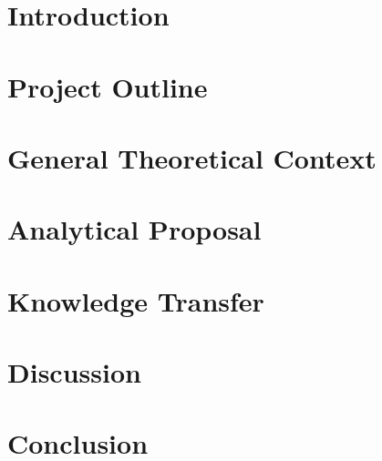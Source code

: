 \documentclass[12pt]{article}
\begin{document}

    
\section{Introduction}
\label{intro}


\section{Project Outline}
\label{project}


\section{General Theoretical Context}
\label{theory}


\section{Analytical Proposal}
\label{analysis}


\section{Knowledge Transfer}
\label{teaching}


\section{Discussion}
\label{discussion}


\section{Conclusion}
\label{conclusion}


\newpage

    

\end{document}
